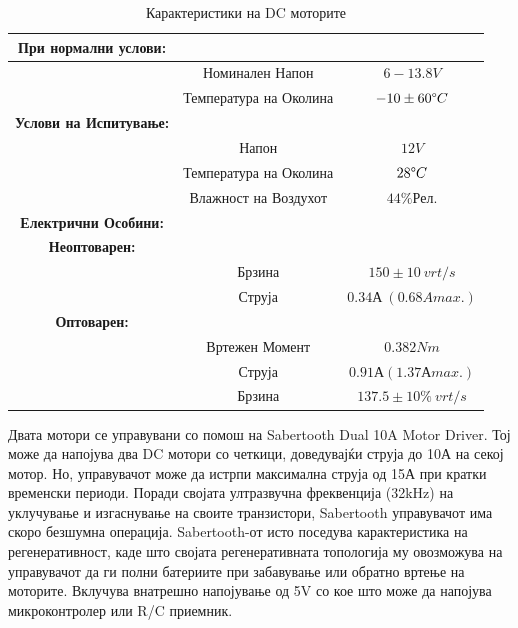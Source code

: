\documentclass[11pt]{article}
\begin{document}
      \begin{table}[H]
        \caption{Карактеристики на DC моторите}
        \label{tab:dcmotor}
        \begin{center}
          \begin{tabular}{||c|c|c||}
            \hline
            \textbf{При нормални услови:} & & \\
            \hline
             & Номинален Напон & $6-13.8V$\\
             & Температура на Околина & $-10 \pm 60 \degree C$\\
            \hline
            \textbf{Услови на Испитување:} & & \\
            \hline
            & Напон & $12V$ \\
            & Температура на Околина & $28 \degree C$\\
            & Влажност на Воздухот & $44\% Рел.$\\
            \hline
            \textbf{Електрични Особини:} & & \\
            \hline
            \textbf{Неоптоварен:} & & \\
            \hline
            & Брзина & $150 \pm 10 \ vrt/s$ \\
            & Струја & $0.34А\ (0.68A max.)$ \\
            \hline
            \textbf{Оптоварен:} & &\\
            \hline
            & Вртежен Момент & $0.382Nm $\\
            & Струја & $0.91А (1.37А max.)$\\
            & Брзина & $137.5 \pm 10 \%\ vrt/s$\\
            \hline
          \end{tabular}
        \end{center}
      \end{table}

		  Двата мотори се управувани со помош на Sabertooth Dual 10A Motor Driver. Тој може да напојува два DC мотори со четкици, доведувајќи струја до 10А на секој мотор. Но, управувачот може да истрпи максимална струја од 15А при кратки временски периоди. Поради својата ултразвучна фреквенција (32kHz) на уклучување и изгаснување на своите транзистори, Sabertooth управувачот има скоро безшумна операција. Sabertooth-от исто поседува карактеристика на регенеративност, каде што својата регенеративната топологија му овозможува на управувачот да ги полни батериите при забавување или обратно вртење на моторите. Вклучува внатрешно напојување од 5V со кое што може да напојува микроконтролер или R/C приемник.
\end{document}

